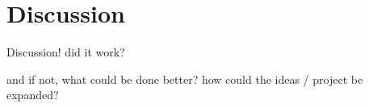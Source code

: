 \chapter{Discussion}
Discussion! did it work?

and if not, what could be done better? how could the ideas / project be expanded?



